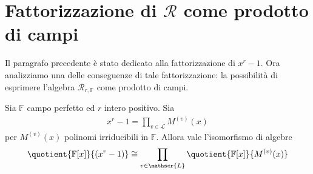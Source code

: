 \section{Fattorizzazione di $\mathcal{R}$ come prodotto di campi}

Il paragrafo precedente è stato dedicato alla fattorizzazione di $x^r - 1$. Ora analizziamo una delle conseguenze di tale fattorizzazione: la possibilità di esprimere l'algebra $\mathcal{R}_{r,\mathbb{F}}$ come prodotto di campi.
\begin{teorema}\label{teo:teoremaGamma}
   Sia $\mathbb{F}$ campo perfetto ed $r$ intero positivo. Sia
   \begin{align*}
        x^r-1 = \prod_{v\in \mathscr{L}} M^{(v)}(x)
   \end{align*}
   per $M^{(v)}(x)$ polinomi irriducibili in $\mathbb{F}$. Allora vale l'isomorfismo di algebre
   \begin{align*}
      \quotient{\mathbb{F} \lbrack x \rbrack  }{(x^{r} - 1)}
      \cong
      \prod_{v\in \mathscr{L}} \quotient{\mathbb{F} \lbrack x \rbrack  }{M^{(v)}(x)}
   \end{align*}
\end{teorema}
